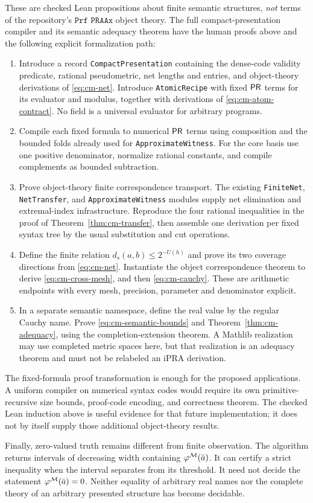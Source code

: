 These are checked Lean propositions about finite semantic structures,
\emph{not} terms of the repository's
$\texttt{Prf PRAAx}$ object theory. The full compact-presentation
compiler and its semantic adequacy theorem have the human proofs above
and the following explicit formalization path:
\begin{enumerate}
\item Introduce a record \texttt{CompactPresentation} containing the
      dense-code validity predicate, rational pseudometric, net lengths
      and entries, and object-theory derivations of
      \eqref{eq:cm-net}. Introduce \texttt{AtomicRecipe} with fixed
      $\mathsf{PR}$ terms for its evaluator and modulus, together with
      derivations of \eqref{eq:cm-atom-contract}. No field is a
      universal evaluator for arbitrary programs.
\item Compile each fixed formula to numerical $\mathsf{PR}$ terms using
      composition and the bounded folds already used for
      \texttt{ApproximateWitness}. For the core basis use one positive
      denominator, normalize rational constants, and compile complements
      as bounded subtraction.
\item Prove object-theory finite correspondence transport. The existing
      \texttt{FiniteNet}, \texttt{NetTransfer}, and
      \texttt{ApproximateWitness} modules supply net elimination and
      extremal-index infrastructure. Reproduce the four rational
      inequalities in the proof of
      Theorem~\ref{thm:cm-transfer}, then assemble one derivation per
      fixed syntax tree by the usual substitution and cut operations.
\item Define the finite relation
      $d_s(a,b)\leq2^{-U(h)}$ and prove its two coverage directions
      from \eqref{eq:cm-net}. Instantiate the object correspondence
      theorem to derive \eqref{eq:cm-cross-mesh}, and then
      \eqref{eq:cm-cauchy}. These are arithmetic endpoints with every
      mesh, precision, parameter and denominator explicit.
\item In a separate semantic namespace, define the real value by the
      regular Cauchy name. Prove \eqref{eq:cm-semantic-bounds} and
      Theorem~\ref{thm:cm-adequacy}, using the completion-extension
      theorem. A Mathlib realization may use completed metric spaces
      here, but that realization is an adequacy theorem and must not
      be relabeled an iPRA derivation.
\end{enumerate}

The fixed-formula proof transformation is enough for the proposed
applications. A uniform compiler on numerical syntax codes would
require its own primitive-recursive size bounds, proof-code encoding,
and correctness theorem. The checked Lean induction above is useful
evidence for that future implementation; it does not by itself supply
those additional object-theory results.

Finally, zero-valued truth remains different from finite observation.
The algorithm returns intervals of decreasing width containing
$\varphi^\mathcal M(\bar a)$. It can certify a strict inequality when the
interval separates from its threshold. It need not decide the
statement $\varphi^\mathcal M(\bar a)=0$. Neither equality of arbitrary real
names nor the complete theory of an arbitrary presented structure
has become decidable.
